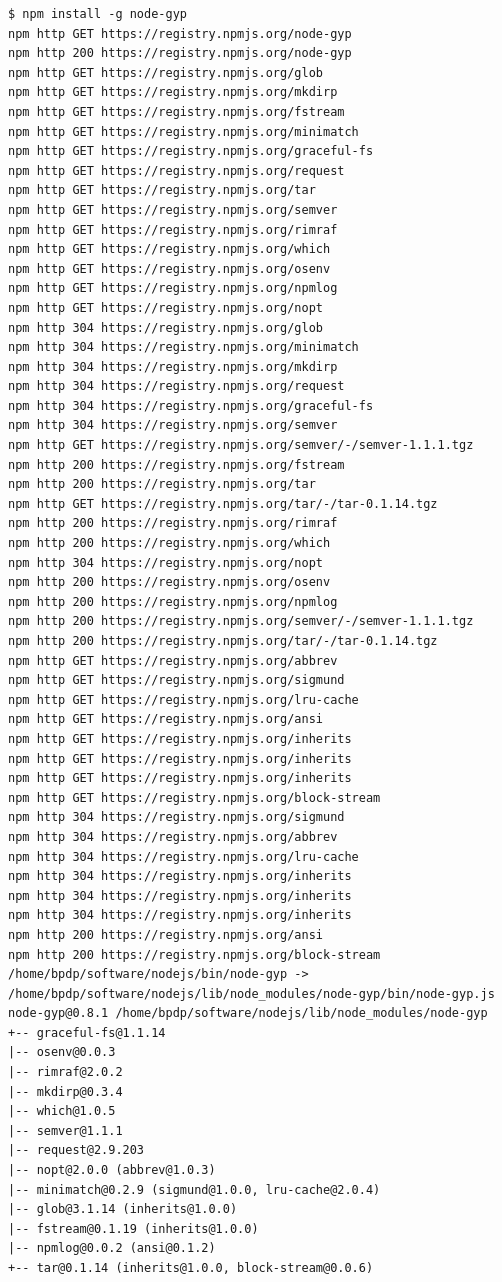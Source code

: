 \lstset{language=bash,caption=Instalasi node-gyp}
\begin{lstlisting}
$ npm install -g node-gyp
npm http GET https://registry.npmjs.org/node-gyp
npm http 200 https://registry.npmjs.org/node-gyp
npm http GET https://registry.npmjs.org/glob
npm http GET https://registry.npmjs.org/mkdirp
npm http GET https://registry.npmjs.org/fstream
npm http GET https://registry.npmjs.org/minimatch
npm http GET https://registry.npmjs.org/graceful-fs
npm http GET https://registry.npmjs.org/request
npm http GET https://registry.npmjs.org/tar
npm http GET https://registry.npmjs.org/semver
npm http GET https://registry.npmjs.org/rimraf
npm http GET https://registry.npmjs.org/which
npm http GET https://registry.npmjs.org/osenv
npm http GET https://registry.npmjs.org/npmlog
npm http GET https://registry.npmjs.org/nopt
npm http 304 https://registry.npmjs.org/glob
npm http 304 https://registry.npmjs.org/minimatch
npm http 304 https://registry.npmjs.org/mkdirp
npm http 304 https://registry.npmjs.org/request
npm http 304 https://registry.npmjs.org/graceful-fs
npm http 304 https://registry.npmjs.org/semver
npm http GET https://registry.npmjs.org/semver/-/semver-1.1.1.tgz
npm http 200 https://registry.npmjs.org/fstream
npm http 200 https://registry.npmjs.org/tar
npm http GET https://registry.npmjs.org/tar/-/tar-0.1.14.tgz
npm http 200 https://registry.npmjs.org/rimraf
npm http 200 https://registry.npmjs.org/which
npm http 304 https://registry.npmjs.org/nopt
npm http 200 https://registry.npmjs.org/osenv
npm http 200 https://registry.npmjs.org/npmlog
npm http 200 https://registry.npmjs.org/semver/-/semver-1.1.1.tgz
npm http 200 https://registry.npmjs.org/tar/-/tar-0.1.14.tgz
npm http GET https://registry.npmjs.org/abbrev
npm http GET https://registry.npmjs.org/sigmund
npm http GET https://registry.npmjs.org/lru-cache
npm http GET https://registry.npmjs.org/ansi
npm http GET https://registry.npmjs.org/inherits
npm http GET https://registry.npmjs.org/inherits
npm http GET https://registry.npmjs.org/inherits
npm http GET https://registry.npmjs.org/block-stream
npm http 304 https://registry.npmjs.org/sigmund
npm http 304 https://registry.npmjs.org/abbrev
npm http 304 https://registry.npmjs.org/lru-cache
npm http 304 https://registry.npmjs.org/inherits
npm http 304 https://registry.npmjs.org/inherits
npm http 304 https://registry.npmjs.org/inherits
npm http 200 https://registry.npmjs.org/ansi
npm http 200 https://registry.npmjs.org/block-stream
/home/bpdp/software/nodejs/bin/node-gyp -> /home/bpdp/software/nodejs/lib/node_modules/node-gyp/bin/node-gyp.js
node-gyp@0.8.1 /home/bpdp/software/nodejs/lib/node_modules/node-gyp
+-- graceful-fs@1.1.14
|-- osenv@0.0.3
|-- rimraf@2.0.2
|-- mkdirp@0.3.4
|-- which@1.0.5
|-- semver@1.1.1
|-- request@2.9.203
|-- nopt@2.0.0 (abbrev@1.0.3)
|-- minimatch@0.2.9 (sigmund@1.0.0, lru-cache@2.0.4)
|-- glob@3.1.14 (inherits@1.0.0)
|-- fstream@0.1.19 (inherits@1.0.0)
|-- npmlog@0.0.2 (ansi@0.1.2)
+-- tar@0.1.14 (inherits@1.0.0, block-stream@0.0.6)
\end{lstlisting}

